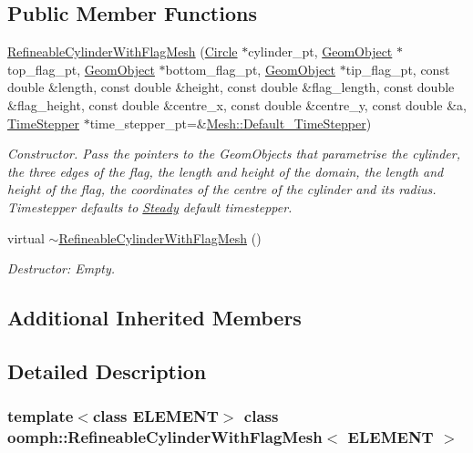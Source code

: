 \subsection*{Public Member Functions}
\begin{DoxyCompactItemize}
\item 
\hyperlink{classoomph_1_1RefineableCylinderWithFlagMesh_ab5cca3144d26422aecc5aa709e8f1ff9}{Refineable\+Cylinder\+With\+Flag\+Mesh} (\hyperlink{classoomph_1_1Circle}{Circle} $\ast$cylinder\+\_\+pt, \hyperlink{classoomph_1_1GeomObject}{Geom\+Object} $\ast$top\+\_\+flag\+\_\+pt, \hyperlink{classoomph_1_1GeomObject}{Geom\+Object} $\ast$bottom\+\_\+flag\+\_\+pt, \hyperlink{classoomph_1_1GeomObject}{Geom\+Object} $\ast$tip\+\_\+flag\+\_\+pt, const double \&length, const double \&height, const double \&flag\+\_\+length, const double \&flag\+\_\+height, const double \&centre\+\_\+x, const double \&centre\+\_\+y, const double \&a, \hyperlink{classoomph_1_1TimeStepper}{Time\+Stepper} $\ast$time\+\_\+stepper\+\_\+pt=\&\hyperlink{classoomph_1_1Mesh_a12243d0fee2b1fcee729ee5a4777ea10}{Mesh\+::\+Default\+\_\+\+Time\+Stepper})
\begin{DoxyCompactList}\small\item\em Constructor. Pass the pointers to the Geom\+Objects that parametrise the cylinder, the three edges of the flag, the length and height of the domain, the length and height of the flag, the coordinates of the centre of the cylinder and its radius. Timestepper defaults to \hyperlink{classoomph_1_1Steady}{Steady} default timestepper. \end{DoxyCompactList}\item 
virtual \hyperlink{classoomph_1_1RefineableCylinderWithFlagMesh_a61744e809a7b7c74288273dfbc448751}{$\sim$\+Refineable\+Cylinder\+With\+Flag\+Mesh} ()
\begin{DoxyCompactList}\small\item\em Destructor\+: Empty. \end{DoxyCompactList}\end{DoxyCompactItemize}
\subsection*{Additional Inherited Members}


\subsection{Detailed Description}
\subsubsection*{template$<$class E\+L\+E\+M\+E\+NT$>$\newline
class oomph\+::\+Refineable\+Cylinder\+With\+Flag\+Mesh$<$ E\+L\+E\+M\+E\+N\+T $>$}

